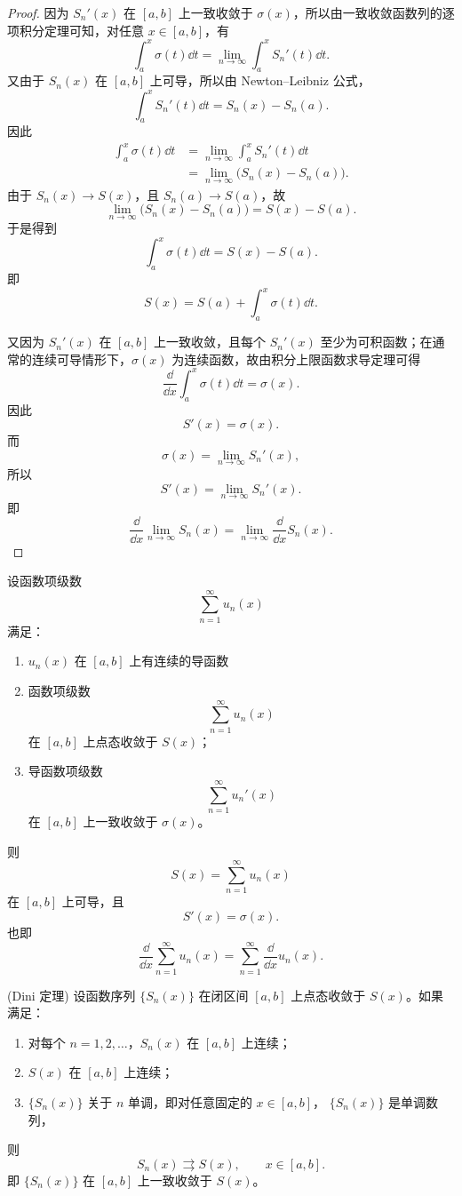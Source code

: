 \begin{proof}
	因为 $S_n'(x)$ 在 $[a,b]$ 上一致收敛于 $\sigma(x)$，所以由一致收敛函数列的逐项积分定理可知，对任意 $x\in[a,b]$，有
	\[
	\int_a^x \sigma(t)\dd t
	=
	\lim_{n\to\infty}\int_a^x S_n'(t)\dd t .
	\]
	又由于 $S_n(x)$ 在 $[a,b]$ 上可导，所以由 Newton--Leibniz 公式，
	\[
	\int_a^x S_n'(t)\dd t
	=
	S_n(x)-S_n(a).
	\]
	因此
	\[
	\begin{aligned}
		\int_a^x \sigma(t)\dd t
		&=
		\lim_{n\to\infty}\int_a^x S_n'(t)\dd t \\
		&=
		\lim_{n\to\infty}\bigl(S_n(x)-S_n(a)\bigr).
	\end{aligned}
	\]
	由于 $S_n(x)\to S(x)$，且 $S_n(a)\to S(a)$，故
	\[
	\lim_{n\to\infty}\bigl(S_n(x)-S_n(a)\bigr)
	=
	S(x)-S(a).
	\]
	于是得到
	\[
	\int_a^x \sigma(t)\dd t
	=
	S(x)-S(a).
	\]
	即
	\[
	S(x)=S(a)+\int_a^x \sigma(t)\dd t.
	\]
	
	又因为 $S_n'(x)$ 在 $[a,b]$ 上一致收敛，且每个 $S_n'(x)$ 至少为可积函数；在通常的连续可导情形下，$\sigma(x)$ 为连续函数，故由积分上限函数求导定理可得
	\[
	\frac{\dd}{\dd x}\int_a^x \sigma(t)\dd t=\sigma(x).
	\]
	因此
	\[
	S'(x)=\sigma(x).
	\]
	而
	\[
	\sigma(x)=\lim_{n\to\infty}S_n'(x),
	\]
	所以
	\[
	S'(x)=\lim_{n\to\infty}S_n'(x).
	\]
	即
	\[
	\frac{\dd}{\dd x}\lim_{n\to\infty}S_n(x)
		=
		\lim_{n\to\infty}\frac{\dd}{\dd x}S_n(x)
	.
	\]
\end{proof}
\begin{proposition}
	设函数项级数
	\[
	\sum_{n=1}^{\infty}u_n(x)
	\]
	满足：
	
	\begin{enumerate}
		\item $u_n(x)$ 在 $[a,b]$ 上有连续的导函数
		\item 函数项级数
		\[
		\sum_{n=1}^{\infty}u_n(x)
		\]
		在 $[a,b]$ 上点态收敛于 $S(x)$；
		\item 导函数项级数
		\[
		\sum_{n=1}^{\infty}u_n'(x)
		\]
		在 $[a,b]$ 上一致收敛于 $\sigma(x)$。
	\end{enumerate}
	
	则
	\[
	S(x)=\sum_{n=1}^{\infty}u_n(x)
	\]
	在 $[a,b]$ 上可导，且
	\[
	S'(x)=\sigma(x).
	\]
	也即
	\[
	\frac{\dd}{\dd x}\sum_{n=1}^{\infty}u_n(x)
	=
	\sum_{n=1}^{\infty}\frac{\dd }{\dd x}u_n(x).
	\]
\end{proposition}

\begin{proposition}(Dini 定理)
	设函数序列 $\{S_n(x)\}$ 在闭区间 $[a,b]$ 上点态收敛于 $S(x)$。如果满足：
	
	\begin{enumerate}
		\item 对每个 $n=1,2,\dots$，$S_n(x)$ 在 $[a,b]$ 上连续；
		\item $S(x)$ 在 $[a,b]$ 上连续；
		\item $\{S_n(x)\}$ 关于 $n$ 单调，即对任意固定的 $x\in[a,b]$，
		$\{S_n(x)\}$ 是单调数列，
	\end{enumerate}
	则
	\[
	S_n(x)\rightrightarrows S(x),\qquad x\in[a,b].
	\]
	即 $\{S_n(x)\}$ 在 $[a,b]$ 上一致收敛于 $S(x)$。
\end{proposition}

